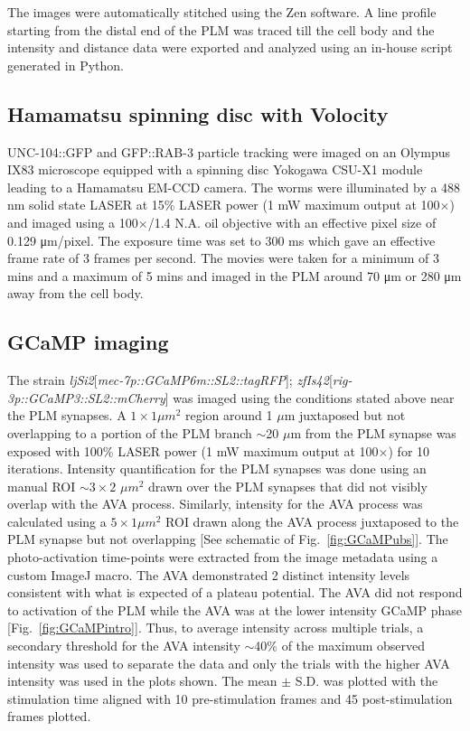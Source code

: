 The images were automatically stitched using the Zen software. A line profile starting from the distal end of the PLM was traced till the cell body and the intensity and distance data were exported and analyzed using an in-house script generated in Python.

\subsection{Hamamatsu spinning disc with Volocity}

UNC-104::GFP and GFP::RAB-3 particle tracking were imaged on an Olympus IX83 microscope equipped with a spinning disc Yokogawa CSU-X1 module leading to a Hamamatsu EM-CCD camera. The worms were illuminated by a 488 nm solid state LASER at 15\% LASER power (1 mW maximum output at 100$\times$) and imaged using a 100$\times$/1.4 N.A. oil objective with an effective pixel size of 0.129 μm/pixel. The exposure time was set to 300 ms which gave an effective frame rate of 3 frames per second. The movies were taken for a minimum of 3 mins and a maximum of 5 mins and imaged in the PLM around 70 μm or 280 μm away from the cell body. 

\subsection{GCaMP imaging}

The strain \textit{ljSi2}[\textit{mec-7p::GCaMP6m::SL2::tagRFP}]; \textit{zfIs42}[\textit{rig-3p::GCaMP3::SL2::mCherry}] was imaged using the conditions stated above near the PLM synapses. A $1 \times 1  \mu m^2$ region around 1 $\mu$m juxtaposed but not overlapping to a portion of the PLM branch $\sim$20 $\mu$m from the PLM synapse was exposed with 100\% LASER power (1 mW maximum output at 100$\times$) for 10 iterations. Intensity quantification for the PLM synapses was done using an manual ROI $\sim 3 \times 2$ $\mu m^2$ drawn over the PLM synapses that did not visibly overlap with the AVA process. Similarly, intensity for the AVA process was calculated using a $5 \times 1  \mu m^2$ ROI drawn along the AVA process juxtaposed to the PLM synapse but not overlapping [See schematic of Fig.~\ref{fig:GCaMPubs}]. The photo-activation time-points were extracted from the image metadata using a custom ImageJ macro. The AVA demonstrated 2 distinct intensity levels consistent with what is expected of a plateau potential. The AVA did not respond to activation of the PLM while the AVA was at the lower intensity GCaMP phase [Fig.~\ref{fig:GCaMPintro}]. Thus, to average intensity across multiple trials, a secondary threshold for the AVA intensity $\sim$40\% of the maximum observed intensity was used to separate the data and only the trials with the higher AVA intensity was used in the plots shown. The mean $\pm$ S.D. was plotted with the stimulation time aligned with 10 pre-stimulation frames and 45 post-stimulation frames plotted. 

